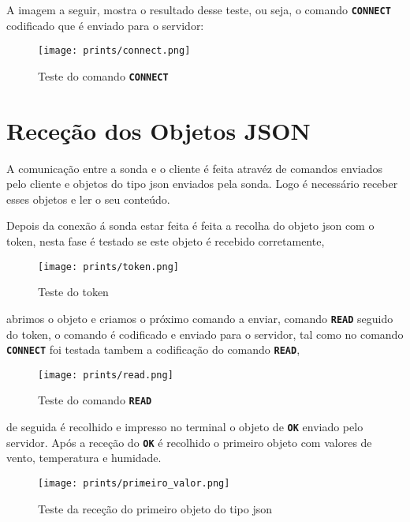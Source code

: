 \documentclass[a4paper]{report}
\begin{document}
A imagem a seguir, mostra o resultado desse teste, ou seja, o comando \textbf{\texttt{CONNECT}} codificado que é enviado para o servidor:

\begin{center}
\begin{figure}[H]
\center
\texttt{[image: prints/connect.png]}
\caption{Teste do comando \textbf{\texttt{CONNECT}}}
\end{figure}
\end{center} 

\section{Receção dos Objetos JSON}

A comunicação entre a sonda e o cliente é feita atravéz de comandos enviados pelo cliente e objetos do tipo \ac{json} enviados pela sonda. Logo é necessário receber esses objetos e ler o seu conteúdo. 

Depois da conexão á sonda estar feita é feita a recolha do objeto \ac{json} com o token, nesta fase é testado se este objeto é recebido corretamente,

\begin{center}
\begin{figure}[H]
\center
\texttt{[image: prints/token.png]}
\caption{Teste do token}
\end{figure}
\end{center}

abrimos o objeto e criamos o próximo comando a enviar, comando \textbf{\texttt{READ}} seguido do token, o comando é codificado e enviado para o servidor, tal como no comando \textbf{\texttt{CONNECT}} foi testada tambem a codificação do comando \textbf{\texttt{READ}}, 

\begin{center}
\begin{figure}[H]
\center
\texttt{[image: prints/read.png]}
\caption{Teste do comando \textbf{\texttt{READ}}}
\end{figure}
\end{center}

de seguida é recolhido e impresso no terminal o objeto de \textbf{\texttt{OK}} enviado pelo servidor. Após a receção do \textbf{\texttt{OK}} é recolhido o primeiro objeto com valores de vento, temperatura e humidade.

\begin{center}
\begin{figure}[H]
\center
\texttt{[image: prints/primeiro\_valor.png]}
\caption{Teste da receção do primeiro objeto do tipo \ac{json}}
\end{figure}
\end{center}
\end{document}
